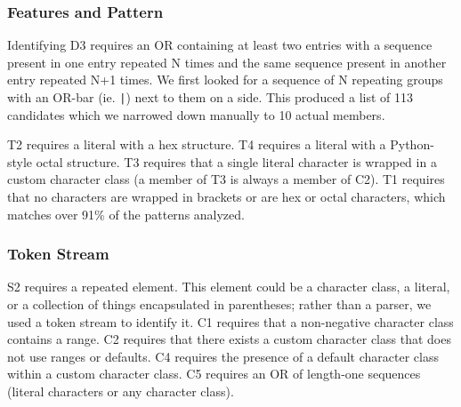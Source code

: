 %





\subsubsection{Features  and Pattern}
Identifying D3 requires an OR containing at least two entries with a sequence present in one entry repeated N times and the same sequence present in another entry repeated N+1 times.  We  first looked for a sequence of N repeating groups with an OR-bar (ie. \verb!|!) next to them on a side.  This produced a list of 113 candidates which we narrowed down manually to 10 actual members.


T2 requires a literal with a hex structure. %
T4 requires a literal with a %
Python-style octal structure. %
T3 requires that a single literal character is wrapped in a custom character class (a member of T3 is always a member of C2).
T1 requires that no characters are wrapped in brackets or are hex or octal characters, which matches over 91\% of the  patterns analyzed.

\subsubsection{Token Stream }
S2 requires a repeated element. This element could be a character class, a literal, or a collection of things encapsulated in parentheses; rather than a parser, we used a token stream to identify it.
C1 requires that a non-negative character class contains a range.  
C2 requires that there exists a custom character class that does not use ranges or defaults. 
C4 requires the presence of a default character class within a custom character class.
C5 requires an OR of length-one sequences (literal characters or any character class).


